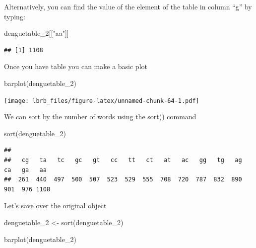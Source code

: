 \documentclass[
]{book}
\newenvironment{Shaded}{\begin{snugshade}}{\end{snugshade}}
\newcommand{\FunctionTok}[1]{\textcolor[rgb]{0.00,0.00,0.00}{#1}}
\newcommand{\NormalTok}[1]{#1}
\newcommand{\OtherTok}[1]{\textcolor[rgb]{0.56,0.35,0.01}{#1}}
\newcommand{\StringTok}[1]{\textcolor[rgb]{0.31,0.60,0.02}{#1}}
\begin{document}
Alternatively, you can find the value of the element of the table in column ``g'' by typing:

\begin{Shaded}
\begin{Highlighting}[]
\NormalTok{denguetable\_2[[}\StringTok{"aa"}\NormalTok{]]}
\end{Highlighting}
\end{Shaded}

\begin{verbatim}
## [1] 1108
\end{verbatim}

Once you have table you can make a basic plot

\begin{Shaded}
\begin{Highlighting}[]
\FunctionTok{barplot}\NormalTok{(denguetable\_2)}
\end{Highlighting}
\end{Shaded}

\texttt{[image: lbrb\_files/figure-latex/unnamed-chunk-64-1.pdf]}

We can sort by the number of words using the sort() command

\begin{Shaded}
\begin{Highlighting}[]
\FunctionTok{sort}\NormalTok{(denguetable\_2)}
\end{Highlighting}
\end{Shaded}

\begin{verbatim}
## 
##   cg   ta   tc   gc   gt   cc   tt   ct   at   ac   gg   tg   ag   ca   ga   aa 
##  261  440  497  500  507  523  529  555  708  720  787  832  890  901  976 1108
\end{verbatim}

Let's save over the original object

\begin{Shaded}
\begin{Highlighting}[]
\NormalTok{denguetable\_2 }\OtherTok{\textless{}{-}} \FunctionTok{sort}\NormalTok{(denguetable\_2)}
\end{Highlighting}
\end{Shaded}

\begin{Shaded}
\begin{Highlighting}[]
\FunctionTok{barplot}\NormalTok{(denguetable\_2)}
\end{Highlighting}
\end{Shaded}
\end{document}
